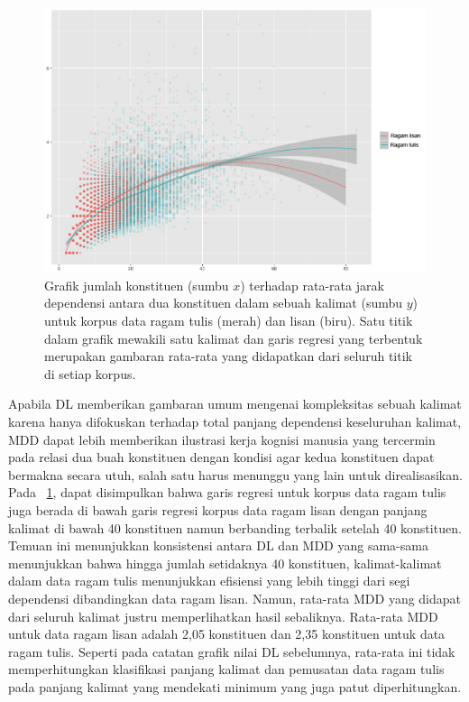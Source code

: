 \begin{figure}
	\centering \includegraphics[width=1
	\textwidth] {pics/lisantulis_MDD.png} 
	\caption{Grafik jumlah konstituen (sumbu $x$) terhadap rata-rata jarak dependensi antara dua konstituen dalam sebuah kalimat (sumbu $y$) untuk korpus data ragam tulis (merah) dan lisan (biru). Satu titik dalam grafik mewakili satu kalimat dan garis regresi yang terbentuk merupakan gambaran rata-rata yang didapatkan dari seluruh titik di setiap korpus.} 
\label{fig:lisantulis_MDD} 
\end{figure}

Apabila DL memberikan gambaran umum mengenai kompleksitas sebuah kalimat karena hanya difokuskan terhadap total panjang dependensi keseluruhan kalimat, MDD dapat lebih memberikan ilustrasi kerja kognisi manusia yang tercermin pada relasi dua buah konstituen dengan kondisi agar kedua konstituen dapat bermakna secara utuh, salah satu harus menunggu yang lain untuk direalisasikan. Pada \pic~\ref{fig:lisantulis_MDD}, dapat disimpulkan bahwa garis regresi untuk korpus data ragam tulis juga berada di bawah garis regresi korpus data ragam lisan dengan panjang kalimat di bawah 40 konstituen namun berbanding terbalik setelah 40 konstituen. Temuan ini menunjukkan konsistensi antara DL dan MDD yang sama-sama menunjukkan bahwa hingga jumlah setidaknya 40 konstituen, kalimat-kalimat dalam data ragam tulis menunjukkan efisiensi yang lebih tinggi dari segi dependensi dibandingkan data ragam lisan. Namun, rata-rata MDD yang didapat dari seluruh kalimat justru memperlihatkan hasil sebaliknya. Rata-rata MDD untuk data ragam lisan adalah 2,05 konstituen dan 2,35 konstituen untuk data ragam tulis. Seperti pada catatan grafik nilai DL sebelumnya, rata-rata ini tidak memperhitungkan klasifikasi panjang kalimat dan pemusatan data ragam tulis pada panjang kalimat yang mendekati minimum yang juga patut diperhitungkan.

